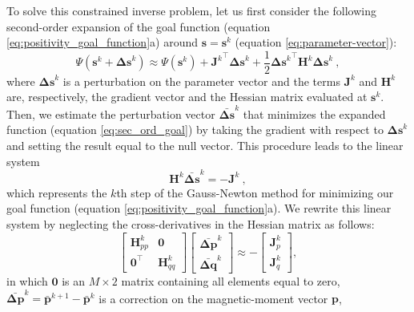To solve this constrained inverse problem, let us first consider the following 
second-order expansion of the goal function (equation \ref{eq:positivity_goal_function}a)
around $\mathbf{s} = \mathbf{s}^{k}$ (equation \ref{eq:parameter-vector}):
\begin{equation}
\Psi(\mathbf{s}^{k} + \mathbf{\Delta s}^{k}) \approx \Psi(\mathbf{s}^{k}) + 
{\mathbf{J}^{k}}^{\top} \mathbf{\Delta s}^{k} + 
\frac{1}{2} {\mathbf{\Delta s}^{k}}^{\top} \mathbf{H}^{k} \mathbf{\Delta s}^{k}  \: ,
\label{eq:sec_ord_goal}
\end{equation}
where $\mathbf{\Delta s}^{k}$ is a perturbation on the parameter vector 
and the terms $\mathbf{J}^{k}$ and $\mathbf{H}^{k}$ are, respectively, the gradient vector 
and the Hessian matrix evaluated at $\mathbf{s}^{k}$.
Then, we estimate the perturbation vector $\bar{\mathbf{\Delta s}}^k$ that minimizes the 
expanded function (equation \ref{eq:sec_ord_goal}) by taking the gradient with respect 
to $\mathbf{\Delta s}^k$ and setting the result equal to the null vector.
This procedure leads to the linear system
\begin{equation}
\mathbf{H}^{k} \bar{\mathbf{\Delta s}}^{k} = - \mathbf{J}^{k} \: ,
\label{eq:linear_sys_GN}
\end{equation}
which represents the $k$th step of the Gauss-Newton method \citep{aster2005} for minimizing 
our goal function (equation \ref{eq:positivity_goal_function}a).
We rewrite this linear system by neglecting the cross-derivatives in the Hessian matrix 
as follows:
\begin{equation}
\left[
\begin{array}{c|c}
\mathbf{H}_{pp}^{k} & \mathbf{0} \\
\hline
\mathbf{0}^{\top} & \mathbf{H}_{qq}^{k}
\end{array}
\right] \left[ \begin{array}{c}
\bar{\mathbf{\Delta p}}^{k} \\ 
\bar{\mathbf{\Delta q}}^{k} 
\end{array} \right] \approx -\left[ \begin{array}{c}
\mathbf{J}_{p}^{k} \\ 
\mathbf{J}_{q}^{k} 
\end{array} \right] ,
\label{eq:linear_sys_GN_block}
\end{equation}
in which $\mathbf{0}$ is an $M \times 2$ matrix containing all elements equal to zero, 
$\bar{\mathbf{\Delta p}}^{k} = \bar{\mathbf{p}}^{k+1} - \bar{\mathbf{p}}^{k}$ 
is a correction on the magnetic-moment vector $\mathbf{p}$,
